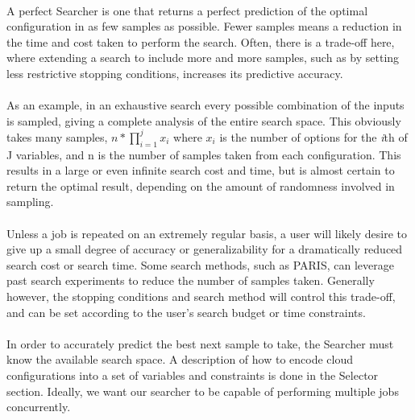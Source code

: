 \documentclass{report}
\begin{document}
\paragraph{}
A perfect Searcher is one that returns a perfect prediction of the optimal configuration in as few samples as possible. Fewer samples means a reduction in the time and cost taken to perform the search. Often, there is a trade-off here, where extending a search to include more and more samples, such as by setting less restrictive stopping conditions, increases its predictive accuracy.

\paragraph{}
As an example, in an exhaustive search every possible combination of the inputs is sampled, giving a complete analysis of the entire search space. This obviously takes many samples, $n * \prod_{i=1}^{j} x_{i}$ where $x_{i}$ is the number of options for the \textit{i}th of J variables, and n is the number of samples taken from each configuration. This results in a large or even infinite search cost and time, but is almost certain to return the optimal result, depending on the amount of randomness involved in sampling.

\paragraph{}
Unless a job is repeated on an extremely regular basis, a user will likely desire to give up a small degree of accuracy or generalizability for a dramatically reduced search cost or search time. Some search methods, such as PARIS\cite{Yadwadkar2017}, can leverage past search experiments to reduce the number of samples taken. Generally however, the stopping conditions and search method will control this trade-off, and can be set according to the user's search budget or time constraints. 

\paragraph{}
In order to accurately predict the best next sample to take, the Searcher must know the available search space.  A description of how to encode cloud configurations into a set of variables and constraints is done in the Selector section. Ideally, we want our searcher to be capable of performing multiple jobs concurrently.
\end{document}
